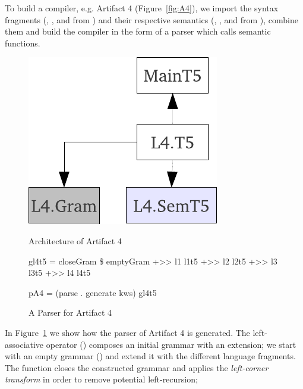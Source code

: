 To build a compiler, e.g. Artifact 4 (Figure~\ref{fig:A4}), we import the syntax fragments (, , 
 and  
from ) and their respective semantics (, 
,  and  from ), 
combine them and build the compiler in the form of a parser which calls semantic functions.
\begin{figure}[th]
\begin{minipage}[b]{0.5\linewidth}
\begin{center}
	\includegraphics[scale=0.6]{cococo/main.pdf}
\caption{Architecture of Artifact 4}
\label{fig:A4}
\end{center}
\end{minipage}
\hspace{0.2cm}
\begin{minipage}[b]{0.5\linewidth}
\begin{haskell}
gl4t5 = closeGram \$ emptyGram +>> 
                    l1 l1t5   +>> 
                    l2 l2t5   +>> 
                    l3 l3t5   +>> 
                    l4 l4t5

pA4 = (parse . generate kws) gl4t5
\end{haskell}
\vspace{-15pt}
\caption{A Parser for Artifact 4}
\label{fig:pA4}
\end{minipage}
\hspace{0.5cm}
\end{figure}
In Figure~\ref{fig:pA4} we show how the parser of Artifact 4 is generated. 
The left-associative operator (\texthaskell{+>>}) composes an initial grammar with an extension;
we start with an empty grammar () and extend it with the different language fragments.
The function  closes the constructed grammar and applies the \emph{left-corner transform} in order to remove potential left-recursion; 
